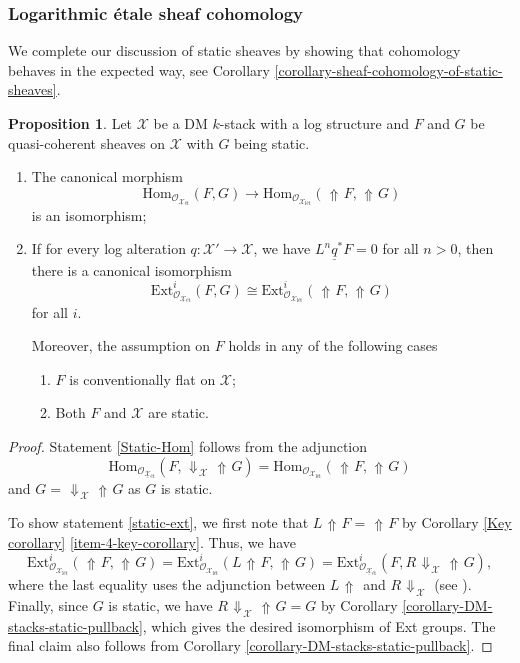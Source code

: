 \documentclass[11pt]{amsart}
\theoremstyle{definition}
\theoremstyle{definition}
\newtheorem{proposition}[theorem]{Proposition}
\DeclareMathOperator{\arrowup}{\!\Uparrow \!}
\DeclareMathOperator{\arrowdown}{\!\Downarrow\!}
\newcommand{\cO}{\mathcal{O}}
\newcommand{\cX}{\mathcal{X}}
\newcommand{\LogO}[1]{\mathcal{O}_{{#1}_\text{l\'et}}}
\newcommand{\ul}[1]{\underline{#1}}
\newcommand{\cal}{\mathcal}
\def\cO{{\cal O}}
\def\cX{{\cal X}}
\begin{document}
\subsubsection{Logarithmic \'etale sheaf cohomology} We complete our discussion of static sheaves by showing that cohomology behaves in the expected way, see Corollary \ref{corollary-sheaf-cohomology-of-static-sheaves}.
\begin{proposition}\label{prop: Ext groups static}
Let $\mathcal{X}$ be a DM $k$-stack with a log structure and $F$ and $G$ be quasi-coherent sheaves on $\mathcal{X}$ with $G$ being static. %
\begin{enumerate}
    \item\label{Static-Hom} The canonical morphism 
    \[\text{Hom}_{\cO_{\underline{\mathcal{X}}{}_{\text{\'et}}}}(F,G)\longrightarrow \text{Hom}_{\LogO{\cX}}(\arrowup F,\arrowup G)\]
    is an isomorphism;
    \item\label{static-ext} If for every log alteration $q\colon\mathcal{X}'\rightarrow \mathcal{X}$, we have $L^{n}\ul{q}^{*} F=0$ for all $n>0$, then there is a canonical isomorphism
    \[\text{Ext}^{i}_{\cO_{\underline{\mathcal{X}}{}_{\text{\'et}}}}(F,G)\cong \text{Ext}_{\LogO{\mathcal{X}}}^{i}(\arrowup F,\arrowup G)\]
    for all $i$.

    Moreover, the assumption on $F$ holds in any of the following cases
    \begin{enumerate}
        \item $F$ is conventionally flat on $\mathcal{X}$;
         \item Both $F$ and $\mathcal{X}$ are static. 
    \end{enumerate}
\end{enumerate}
\end{proposition}
\begin{proof}
Statement \eqref{Static-Hom} follows from the adjunction 
\[\text{Hom}_{\cO_{\underline{\mathcal{X}}{}_{\text{\'et}}}}(F,\arrowdown_\mathcal{X}\arrowup G) = \text{Hom}_{\LogO{\mathcal{X}}}(\arrowup F,\arrowup G)\]
and $G= \arrowdown_{\mathcal{X}}\arrowup G$ as $G$ is static.

To show statement \eqref{static-ext}, we first note that $L\arrowup F=\arrowup F$ by Corollary \ref{Key corollary} \eqref{item-4-key-corollary}. Thus, we have
\[\text{Ext}^{i}_{\cO_{\mathcal{X}_{\text{l\'et}}}}(\arrowup F,\arrowup G)=\text{Ext}^{i}_{\cO_{\mathcal{X}_{\text{l\'et}}}}(L\arrowup F,\arrowup G)=\text{Ext}^{i}_{\mathcal{O}_{\ul{\mathcal{X}}{}_{\text{\'et}}}}(F,R\arrowdown_\mathcal{X}\arrowup G),\]
where the last equality uses the adjunction between $L\arrowup$ and $R\arrowdown_\mathcal{X}$ (see \cite[0FTR]{stacks}). Finally, since $G$ is static, we have $R\arrowdown_\mathcal{X}\arrowup G = G$ by Corollary \ref{corollary-DM-stacks-static-pullback}, which gives the desired isomorphism of Ext groups.
The final claim also follows from Corollary \ref{corollary-DM-stacks-static-pullback}.
\end{proof}
\end{document}
